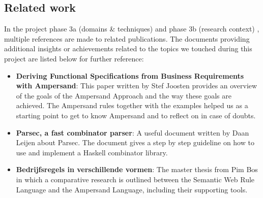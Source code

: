 
\subsection{Related work}
In the project phase 3a (domains \& techniques) and phase 3b (research context) , multiple references are made to related publications.
The documents providing additional insights or achievements related to the topics we touched during this project are listed below for further reference:

\begin{itemize}
  \item \textbf{Deriving Functional Specifications from Business Requirements with Ampersand}:
    This paper  written by Stef Joosten provides an overview of the goals of the Ampersand Approach and the way these goals are achieved. 
    The Ampersand rules together with the examples helped us as a starting point to get to know Ampersand and to  reflect on in case of doubts.
  \item \textbf{Parsec, a fast combinator parser}:
    A useful document  written by Daan Leijen about Parsec.
    The document gives a step by step guideline on how to use and implement a Haskell combinator library.
  \item \textbf{Bedrijfsregels in verschillende vormen}:
    The master thesis  from Pim Bos in which a comparative research is outlined between the Semantic Web Rule Language and the Ampersand Language, including their supporting tools.
\end{itemize}